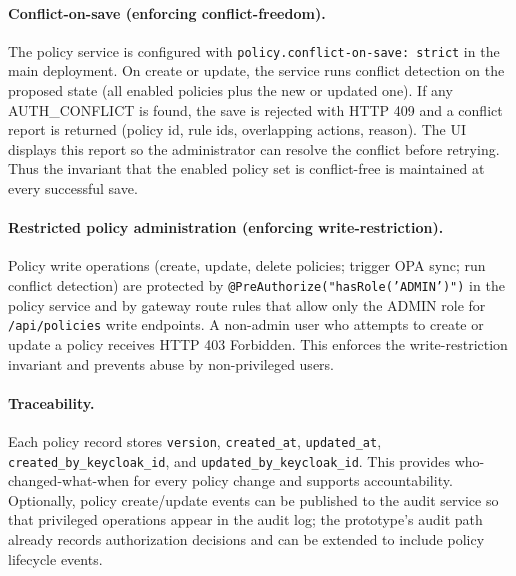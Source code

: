 \paragraph{Conflict-on-save (enforcing conflict-freedom).}
The policy service is configured with \texttt{policy.conflict-on-save: strict} in the main deployment. On create or update, the service runs conflict detection on the proposed state (all enabled policies plus the new or updated one). If any AUTH\_CONFLICT is found, the save is rejected with HTTP 409 and a conflict report is returned (policy id, rule ids, overlapping actions, reason). The UI displays this report so the administrator can resolve the conflict before retrying. Thus the invariant that the enabled policy set is conflict-free is maintained at every successful save.
\vspace{0.5cm}

\paragraph{Restricted policy administration (enforcing write-restriction).}
Policy write operations (create, update, delete policies; trigger OPA sync; run conflict detection) are protected by \texttt{@PreAuthorize("hasRole('ADMIN')")} in the policy service and by gateway route rules that allow only the ADMIN role for \texttt{/api/policies} write endpoints. A non-admin user who attempts to create or update a policy receives HTTP 403 Forbidden. This enforces the write-restriction invariant and prevents abuse by non-privileged users.
\vspace{0.5cm}

\paragraph{Traceability.}
Each policy record stores \texttt{version}, \texttt{created\_at}, \texttt{updated\_at}, \texttt{created\_by\_keycloak\_id}, and \texttt{updated\_by\_keycloak\_id}. This provides who-changed-what-when for every policy change and supports accountability. Optionally, policy create/update events can be published to the audit service so that privileged operations appear in the audit log; the prototype's audit path already records authorization decisions and can be extended to include policy lifecycle events.
\vspace{0.5cm}

